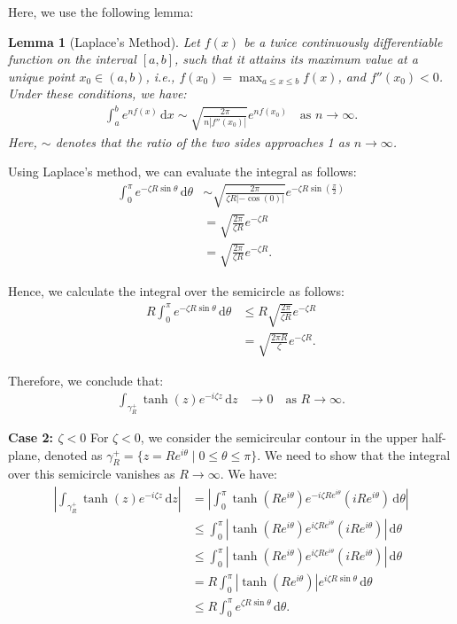 \documentclass[a4paper,12pt]{article}
\newtheorem{lem}[thm]{Lemma}
\newcommand{\z}{\zeta}
\newcommand{\dd}{\mathrm{d}}
\begin{document}
Here, we use the following lemma:

\begin{lem}[Laplace's Method]
Let $f(x)$ be a twice continuously differentiable function on the interval $[a, b]$,
 such that it attains its maximum value at a unique point $x_0 \in (a, b)$, i.e., $f(x_0) = \max_{a \leq x \leq b} f(x)$, and $f''(x_0) < 0$.
 Under these conditions, we have:
\begin{align*}
  \int_a^b e^{n f(x)} \, \dd x \sim \sqrt{\frac{2\pi}{n\left|f''(x_0)\right|}}  e^{n f(x_0)} \quad \text{as } n \to \infty.
\end{align*}
Here, $\sim$ denotes that the ratio of the two sides approaches 1 as $n \to \infty$.
\end{lem}
Using Laplace's method, we can evaluate the integral as follows:
\begin{align*}
  \int_{0}^{\pi} e^{ -\z R \sin \theta} \, \dd\theta &\sim \sqrt{\frac{2\pi}{\z R \left| -\cos(0) \right|}} e^{ -\z R \sin(\frac{\pi}{2})} \\
  &= \sqrt{\frac{2\pi}{\z R}} e^{ -\z R} \\
  &= \sqrt{\frac{2\pi}{\z R}} e^{ -\z R}.
\end{align*}

Hence, we calculate the integral over the semicircle as follows:
\begin{align*}
  R \int_{0}^{\pi} e^{ -\z R \sin \theta} \, \dd\theta &\leq R \sqrt{\frac{2\pi}{\z R}} e^{ -\z R} \\
  &= \sqrt{\frac{2\pi R}{\z}} e^{ -\z R}.
\end{align*}

Therefore, we conclude that:
\begin{align*}
  \int_{\gamma^+_R} \tanh(z)e^{-i \z z} \, \dd z &\to 0 \quad \text{as } R \to \infty.
\end{align*}

\bigskip

\textbf{Case 2: $\zeta < 0$}
For $\z < 0$, we consider the semicircular contour in the upper half-plane, denoted as $\gamma^+_R = \{ z = R e^{i\theta} \mid 0 \leq \theta \leq \pi \}$.
We need to show that the integral over this semicircle vanishes as $R \to \infty$.
We have:
\begin{align*}
  \left|\int_{\gamma^+_R} \tanh(z)e^{-i \z z} \, \dd z\right| &= \left| \int_{0}^{\pi} \tanh(R e^{i\theta}) e^{-i \z R e^{i\theta}} (i R e^{i\theta}) \, \dd\theta \right| \\
  &\leq \int_{0}^{\pi} \left| \tanh(R e^{i\theta}) e^{i \z R e^{i\theta}} (i R e^{i\theta}) \right| \, \dd\theta \\
  &\leq \int_{0}^{\pi} \left| \tanh(R e^{i\theta}) e^{i \z R e^{i\theta}} (i R e^{i\theta}) \right| \, \dd\theta \\
  &=  R \int_{0}^{\pi} \left| \tanh(R e^{i\theta})  \right|e^{ i \z R \sin \theta} \, \dd\theta \\
  &\leq  R \int_{0}^{\pi} e^{\z R \sin \theta} \, \dd\theta.
\end{align*}
\end{document}
